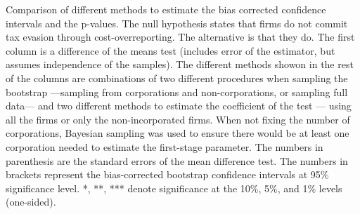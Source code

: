 \documentclass[
  12pt]{article}
\theoremstyle{definition}
\theoremstyle{remark}
\begin{document}
\begin{table}

\caption{\label{tbl-comp-test}Comparison of different methods to
estimate the bias corrected confidence intervals and the p-values. The
null hypothesis states that firms do not commit tax evasion through
cost-overreporting. The alternative is that they do. The first column is
a difference of the means test (includes error of the estimator, but
assumes independence of the samples). The different methods showon in
the rest of the columns are combinations of two different procedures
when sampling the bootstrap ---sampling from corporations and
non-corporations, or sampling full data--- and two different methods to
estimate the coefficient of the test --- using all the firms or only the
non-incorporated firms. When not fixing the number of corporations,
Bayesian sampling was used to ensure there would be at least one
corporation needed to estimate the first-stage parameter. The numbers in
parenthesis are the standard errors of the mean difference test. The
numbers in brackets represent the bias-corrected bootstrap confidence
intervals at 95\% significance level. *, **, *** denote significance at
the 10\%, 5\%, and 1\% levels (one-sided).}

\centering{

}
\end{table}
\end{document}

